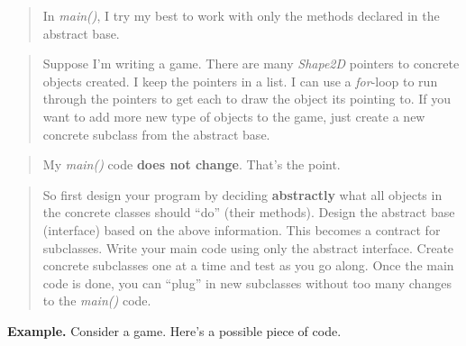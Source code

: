 \documentclass[
]{article}
\begin{document}
\begin{quote}
\end{quote}

\begin{quote}
In \emph{main()}, I try my best to work with only the methods declared
in the abstract base.
\end{quote}

\begin{quote}
Suppose I'm writing a game. There are many \emph{Shape2D} pointers to
concrete objects created. I keep the pointers in a list. I can use a
\emph{for}-loop to run through the pointers to get each to draw the
object its pointing to. If you want to add more new type of objects to
the game, just create a new concrete subclass from the abstract base.
\end{quote}

\begin{quote}
\end{quote}

\begin{quote}
My \emph{main()} code \textbf{does not change}. That's the point.
\end{quote}

\begin{quote}
So first design your program by deciding \textbf{abstractly} what all
objects in the concrete classes should ``do'' (their methods). Design
the abstract base (interface) based on the above information. This
becomes a contract for subclasses. Write your main code using only the
abstract interface. Create concrete subclasses one at a time and test as
you go along. Once the main code is done, you can ``plug'' in new
subclasses without too many changes to the \emph{main()} code.
\end{quote}

\textbf{Example.} Consider a game. Here's a possible piece of code.
\end{document}
